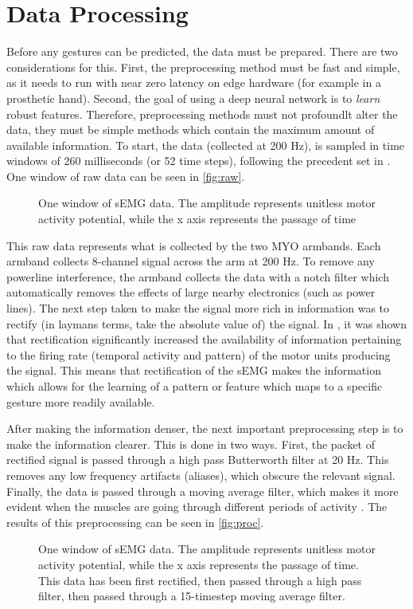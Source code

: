 \section{Data Processing}

Before any gestures can be predicted, the data must be prepared. There are two considerations for this. First, the preprocessing method must be fast and simple, as it needs to run with near zero latency on edge hardware (for example in a prosthetic hand). Second, the goal of using a deep neural network is to \emph{learn} robust features. Therefore, preprocessing methods must not profoundlt alter the data, they must be simple methods which contain the maximum amount of available information. To start, the data (collected at 200 Hz), is sampled in time windows of 260 milliseconds (or 52 time steps), following the precedent set in \cite{primary}. One window of raw data can be seen in \autoref{fig:raw}.

\begin{figure}[h]
\caption{One window of sEMG data. The amplitude represents unitless motor activity potential, while the x axis represents the passage of time}
\label{fig:raw}
    \centering
    \def\svgwidth{\columnwidth}
    
\end{figure}

This raw data represents what is collected by the two MYO armbands. Each armband collects 8-channel signal across the arm at 200 Hz. To remove any powerline interference, the armband collects the data with a notch filter which automatically removes the effects of large nearby electronics (such as power lines). The next step taken to make the signal more rich in information was to rectify (in laymans terms, take the absolute value of) the signal. In \cite{rectif}, it was shown that rectification significantly increased the availability of information pertaining to the  firing rate (temporal activity and pattern) of the motor units producing the signal. This means that rectification of the sEMG makes the information which allows for the learning of a pattern or feature which maps to a specific gesture more readily available.
\par After making the information denser, the next important preprocessing step is to make the information clearer. This is done in two ways. First, the packet of rectified signal is passed through a high pass Butterworth filter at 20 Hz. This removes any low frequency artifacts (aliases), which obscure the relevant signal. Finally, the data is passed through a moving average filter, which makes it more evident when the muscles are going through different periods of activity \cite{humancom}. The results of this preprocessing can be seen in \autoref{fig:proc}.
\begin{figure}[h!]
\caption{One window of sEMG data. The amplitude represents unitless motor activity potential, while the x axis represents the passage of time. This data has been first rectified, then passed through a high pass filter, then passed through a 15-timestep moving average filter.}
\label{fig:proc}
    \centering
    \def\svgwidth{\columnwidth}
    
\end{figure}

